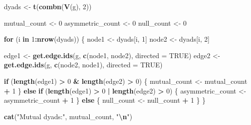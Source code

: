 \documentclass[
]{article}
\newenvironment{Shaded}{\begin{snugshade}}{\end{snugshade}}
\newcommand{\AttributeTok}[1]{\textcolor[rgb]{0.13,0.29,0.53}{#1}}
\newcommand{\ConstantTok}[1]{\textcolor[rgb]{0.56,0.35,0.01}{#1}}
\newcommand{\ControlFlowTok}[1]{\textcolor[rgb]{0.13,0.29,0.53}{\textbf{#1}}}
\newcommand{\DecValTok}[1]{\textcolor[rgb]{0.00,0.00,0.81}{#1}}
\newcommand{\FunctionTok}[1]{\textcolor[rgb]{0.13,0.29,0.53}{\textbf{#1}}}
\newcommand{\NormalTok}[1]{#1}
\newcommand{\OtherTok}[1]{\textcolor[rgb]{0.56,0.35,0.01}{#1}}
\newcommand{\SpecialCharTok}[1]{\textcolor[rgb]{0.81,0.36,0.00}{\textbf{#1}}}
\newcommand{\StringTok}[1]{\textcolor[rgb]{0.31,0.60,0.02}{#1}}
\begin{document}
\begin{Shaded}
\begin{Highlighting}[]
\NormalTok{dyads }\OtherTok{\textless{}{-}} \FunctionTok{t}\NormalTok{(}\FunctionTok{combn}\NormalTok{(}\FunctionTok{V}\NormalTok{(g), }\DecValTok{2}\NormalTok{))}

\NormalTok{mutual\_count }\OtherTok{\textless{}{-}} \DecValTok{0}
\NormalTok{asymmetric\_count }\OtherTok{\textless{}{-}} \DecValTok{0}
\NormalTok{null\_count }\OtherTok{\textless{}{-}} \DecValTok{0}

\ControlFlowTok{for}\NormalTok{ (i }\ControlFlowTok{in} \DecValTok{1}\SpecialCharTok{:}\FunctionTok{nrow}\NormalTok{(dyads)) \{}
\NormalTok{  node1 }\OtherTok{\textless{}{-}}\NormalTok{ dyads[i, }\DecValTok{1}\NormalTok{]}
\NormalTok{  node2 }\OtherTok{\textless{}{-}}\NormalTok{ dyads[i, }\DecValTok{2}\NormalTok{]}
  
\NormalTok{  edge1 }\OtherTok{\textless{}{-}} \FunctionTok{get.edge.ids}\NormalTok{(g, }\FunctionTok{c}\NormalTok{(node1, node2), }\AttributeTok{directed =} \ConstantTok{TRUE}\NormalTok{)}
\NormalTok{  edge2 }\OtherTok{\textless{}{-}} \FunctionTok{get.edge.ids}\NormalTok{(g, }\FunctionTok{c}\NormalTok{(node2, node1), }\AttributeTok{directed =} \ConstantTok{TRUE}\NormalTok{)}
  
  \ControlFlowTok{if}\NormalTok{ (}\FunctionTok{length}\NormalTok{(edge1) }\SpecialCharTok{\textgreater{}} \DecValTok{0} \SpecialCharTok{\&} \FunctionTok{length}\NormalTok{(edge2) }\SpecialCharTok{\textgreater{}} \DecValTok{0}\NormalTok{) \{}
\NormalTok{    mutual\_count }\OtherTok{\textless{}{-}}\NormalTok{ mutual\_count }\SpecialCharTok{+} \DecValTok{1}
\NormalTok{  \} }\ControlFlowTok{else} \ControlFlowTok{if}\NormalTok{ (}\FunctionTok{length}\NormalTok{(edge1) }\SpecialCharTok{\textgreater{}} \DecValTok{0} \SpecialCharTok{|} \FunctionTok{length}\NormalTok{(edge2) }\SpecialCharTok{\textgreater{}} \DecValTok{0}\NormalTok{) \{}
\NormalTok{    asymmetric\_count }\OtherTok{\textless{}{-}}\NormalTok{ asymmetric\_count }\SpecialCharTok{+} \DecValTok{1}
\NormalTok{  \} }\ControlFlowTok{else}\NormalTok{ \{}
\NormalTok{    null\_count }\OtherTok{\textless{}{-}}\NormalTok{ null\_count }\SpecialCharTok{+} \DecValTok{1}
\NormalTok{  \}}
\NormalTok{\}}

\FunctionTok{cat}\NormalTok{(}\StringTok{"Mutual dyads:"}\NormalTok{, mutual\_count, }\StringTok{"}\SpecialCharTok{\textbackslash{}n}\StringTok{"}\NormalTok{)}
\end{Highlighting}
\end{Shaded}
\end{document}
